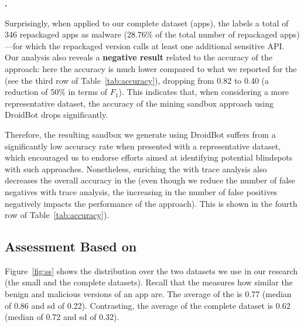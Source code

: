 

{\bf \cds.}

Surprisingly, when applied to our complete dataset (\apps apps), the \mas
labels a total of 346 repackaged apps as malware (28.76\% of the total number of repackaged
apps)---for which the repackaged version calls at least one additional sensitive API.
Our analysis also reveals a {\bf negative result} related to the accuracy of the approach: here
the accuracy is much lower compared to what we reported for the
\sds (see the third row of Table~\ref{tab:accuracy}), dropping from 0.82 to 0.40 (a reduction of 50\% in terms of $F_1$).
This indicates that, when considering a more representative dataset, the accuracy of the mining sandbox
approach using DroidBot drops significantly. 


Therefore, the resulting sandbox we generate using
DroidBot suffers from a significantly low accuracy rate when presented with a representative dataset, 
which encouraged us to endorse efforts aimed at identifying potential blindspots with such approaches.
Nonetheless, enriching the \mas with trace analysis also
decreases the overall accuracy in the \cds (even though we reduce the
number of false negatives with trace analysis, the increasing in the
number of false positives negatively impacts the performance of the
approach). This is shown in the fourth row of Table~\ref{tab:accuracy}).


\subsection{Assessment Based on \sscore}

Figure~\ref{fig:ss} shows the \sscore distribution
over the two datasets we use in our research
(the small and the complete datasets).
Recall that the \sscore measures how similar the
benign and malicious versions of an app are.
The average \sscore of the
\sds is 0.77 (median of 0.86 and sd of 0.22). Contrasting,
the average \sscore of the complete dataset is
0.62 (median of 0.72 and sd of 0.32).

